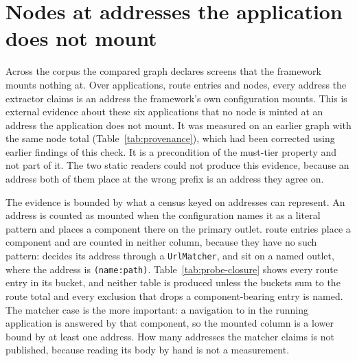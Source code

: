 \section{Nodes at addresses the application does not mount}
\label{sec:res-unmounted}

Across the corpus the compared graph declares \ProbeInvented{} screens that the framework mounts nothing
at. Over \ProbeApps{} applications, \ProbeRoutes{} route entries and \ProbeNodes{} nodes, every
address the extractor claims is an address the framework's own configuration mounts. This is
external evidence about these six applications that no node is minted at an address the application
does not mount. It was measured on an earlier graph with the same node total (Table~\ref{tab:provenance}), which had been corrected using earlier findings of this check. It is a precondition of the must-tier property and not part of it. The
two static readers could not produce this evidence, because an address both of them place at the
wrong prefix is an address they agree on.

The evidence is bounded by what a census keyed on addresses can represent. An address is counted as
mounted when the configuration names it as a literal pattern and places a component there on the
primary outlet. \ProbeUnaddressableScreens{} route entries place a component and are counted in
neither column, because they have no such pattern: \ProbeMatcherScreens{} decides its address through
a \texttt{UrlMatcher}, and \ProbeOutletScreens{} sit on a named outlet, where the address is
\texttt{(name:path)}. Table~\ref{tab:probe-closure} shows every route entry in its bucket, and
neither table is produced unless the buckets sum to the route total and every exclusion
that drops a component-bearing entry is named. The matcher case is the more important: a navigation to
 in the running application is answered by that component, so the mounted column
is a lower bound by at least one address. How many addresses the matcher claims is not published,
because reading its body by hand is not a measurement.

